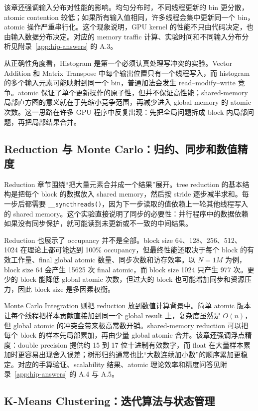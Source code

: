 \documentclass[10pt,a4paper]{article}
\begin{document}
该章还强调输入分布对性能的影响。均匀分布时，不同线程更新的 bin 更分散，atomic contention 较低；如果所有输入值相同，许多线程会集中更新同一个 bin，atomic 操作严重串行化。这个现象说明，GPU kernel 的性能不只由代码决定，也由输入数据分布决定。对应的 memory traffic 计算、实验时间和不同输入分布分析见附录~\ref{app:hip-answers} 的 A.3。

从正确性角度看，Histogram 是第一个必须认真处理写冲突的实验。Vector Addition 和 Matrix Transpose 中每个输出位置只有一个线程写入，而 histogram 的多个输入元素可能映射到同一个 bin，普通加法会发生 read--modify--write 竞争。atomic 保证了单个更新操作的原子性，但并不保证高性能；shared-memory 局部直方图的意义就在于先缩小竞争范围，再减少进入 global memory 的 atomic 次数。这一思路在许多 GPU 程序中反复出现：先把全局问题拆成 block 内局部问题，再把局部结果合并。

\subsection{Reduction 与 Monte Carlo：归约、同步和数值精度}

Reduction 章节围绕“把大量元素合并成一个结果”展开。tree reduction 的基本结构是把每个 block 的数据放入 shared memory，然后按 stride 逐步减半求和。每一步后都需要 \texttt{\_\_syncthreads()}，因为下一步读取的值依赖上一轮其他线程写入的 shared memory。这个实验直接说明了同步的必要性：并行程序中的数据依赖如果没有同步保护，就可能读到未更新或不一致的中间结果。

Reduction 也展示了 occupancy 并不是全部。block size 64、128、256、512、1024 在理论上都可能达到 100\% occupancy，但最终性能还取决于每个 block 的有效工作量、final global atomic 数量、同步次数和访存效率。以 $N=1M$ 为例，block size 64 会产生 15625 次 final atomic，而 block size 1024 只产生 977 次。更少的 block 能降低 global atomic 次数，但过大的 block 也可能增加同步和资源压力，因此 block size 是多因素权衡。

Monte Carlo Integration 则把 reduction 放到数值计算背景中。简单 atomic 版本让每个线程把样本贡献直接加到同一个 global result 上，复杂度虽然是 $O(n)$，但 global atomic 的冲突会带来极高常数开销。shared-memory reduction 可以把每个 block 的样本先局部累加，再由少量 global atomic 合并。该章还强调浮点精度：double precision 提供约 15 到 17 位十进制有效数字，而 float 在大量样本累加时更容易出现舍入误差；树形归约通常也比“大数连续加小数”的顺序累加更稳定。对应的手算验证、scalability 结果、atomic 理论效率和精度问答见附录~\ref{app:hip-answers} 的 A.4 与 A.5。

\subsection{K-Means Clustering：迭代算法与状态管理}
\end{document}
